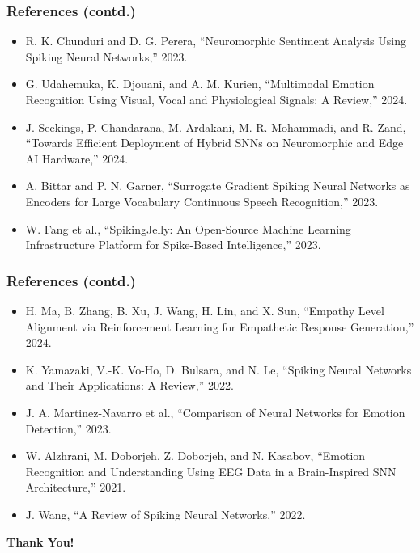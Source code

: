 \documentclass[aspectratio=169]{beamer}
\begin{document}
\begin{frame}
    \frametitle{References (contd.)}
    \begin{itemize}
        \item R. K. Chunduri and D. G. Perera, ``Neuromorphic Sentiment Analysis Using Spiking Neural Networks,'' 2023.
        
        \item G. Udahemuka, K. Djouani, and A. M. Kurien, ``Multimodal Emotion Recognition Using Visual, Vocal and Physiological Signals: A Review,'' 2024.
        
        \item J. Seekings, P. Chandarana, M. Ardakani, M. R. Mohammadi, and R. Zand, ``Towards Efficient Deployment of Hybrid SNNs on Neuromorphic and Edge AI Hardware,'' 2024.
        
        \item A. Bittar and P. N. Garner, ``Surrogate Gradient Spiking Neural Networks as Encoders for Large Vocabulary Continuous Speech Recognition,'' 2023.
        
        \item W. Fang et al., ``SpikingJelly: An Open-Source Machine Learning Infrastructure Platform for Spike-Based Intelligence,'' 2023.
    \end{itemize}
\end{frame}

\begin{frame}
    \frametitle{References (contd.)}
    \begin{itemize}
        \item H. Ma, B. Zhang, B. Xu, J. Wang, H. Lin, and X. Sun, ``Empathy Level Alignment via Reinforcement Learning for Empathetic Response Generation,'' 2024.
        
        \item K. Yamazaki, V.-K. Vo-Ho, D. Bulsara, and N. Le, ``Spiking Neural Networks and Their Applications: A Review,'' 2022.
        
        \item J. A. Martinez-Navarro et al., ``Comparison of Neural Networks for Emotion Detection,'' 2023.
        
        \item W. Alzhrani, M. Doborjeh, Z. Doborjeh, and N. Kasabov, ``Emotion Recognition and Understanding Using EEG Data in a Brain-Inspired SNN Architecture,'' 2021.
        
        \item J. Wang, ``A Review of Spiking Neural Networks,'' 2022.
    \end{itemize}
\end{frame}


\begin{frame}
    \begin{center}
        \Large \textbf{Thank You!}
    \end{center}
\end{frame}
\end{document}
